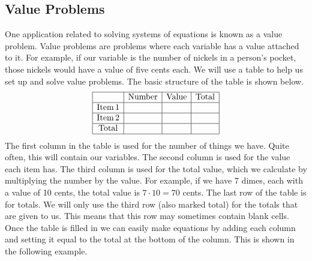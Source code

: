 \subsection{Value Problems}\par

{}\pp

One application related to solving systems of equations is known as a value problem. Value
problems are problems where each variable has a value attached to it. For example,
if our variable is the number of nickels in a person's pocket, those nickels
would have a value of five cents each. We will use a table to help us set up
and solve value problems. The basic structure of the table is shown below.
\[ \begin{array}{|c|c|c|c|}
     \hline
     & \operatorname{Number} & \operatorname{Value} & \operatorname{Total}\\
     \hline
     \operatorname{Item} 1 &  &  & \\
     \hline
     \operatorname{Item} 2 &  &  & \\
     \hline
     \operatorname{Total} &  &  & \\
     \hline
   \end{array} \]
The first column in the table is used for the number of things we have. Quite
often, this will contain our variables. The second column is used for the value each item has. The third column is used for the total value, which we calculate by multiplying the number by the value. For example, if we have 7 dimes, each with a value of 10 cents, the total value is $7 \cdot 10 = 70$
cents. The last row of the table is for totals. We will only use the third row
(also marked total) for the totals that are given to us. This means that this row may sometimes contain blank cells. Once the table is filled in we can easily
make equations by adding each column and setting it equal to the total at the
bottom of the column. This is shown in the following example.



